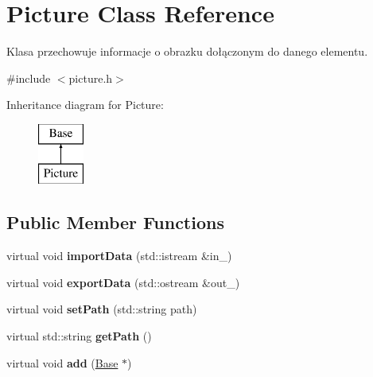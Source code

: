 \hypertarget{class_picture}{}\section{Picture Class Reference}
\label{class_picture}


Klasa przechowuje informacje o obrazku dołączonym do danego elementu.  




{\ttfamily \#include $<$picture.\+h$>$}

Inheritance diagram for Picture\+:\begin{figure}[H]
\begin{center}
\leavevmode
\includegraphics[height=2.000000cm]{class_picture}
\end{center}
\end{figure}
\subsection*{Public Member Functions}
\begin{DoxyCompactItemize}
\item 
\mbox{\label{class_picture_afaa06c0b911691026417379d5b78477d}} 
virtual void {\bfseries import\+Data} (std\+::istream \&in\+\_\+)
\item 
\mbox{\label{class_picture_a38c495d9851a7ebe12344d7b8e7075d5}} 
virtual void {\bfseries export\+Data} (std\+::ostream \&out\+\_\+)
\item 
\mbox{\label{class_picture_a8826800da424208a9475242817c2d050}} 
virtual void {\bfseries set\+Path} (std\+::string path)
\item 
\mbox{\label{class_picture_ac9f36933f7bf3ac9e40684891b2129bb}} 
virtual std\+::string {\bfseries get\+Path} ()
\item 
\mbox{\label{class_picture_a128bb0b00a4d0b0685bedb00160e3991}} 
virtual void {\bfseries add} (\mbox{\hyperlink{class_base}{Base}} $\ast$)
\end{DoxyCompactItemize}
